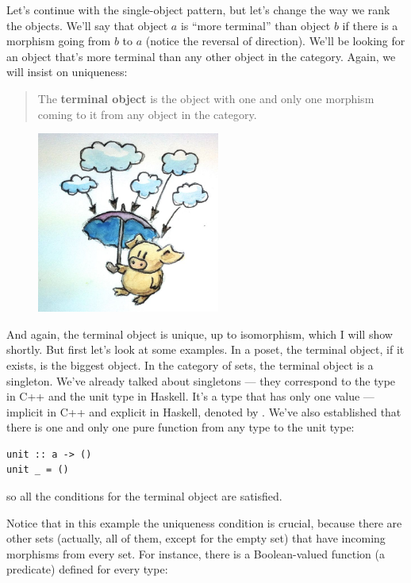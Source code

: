 Let's continue with the single-object pattern, but let's change the way
we rank the objects. We'll say that object $a$ is ``more terminal''
than object $b$ if there is a morphism going from $b$ to
$a$ (notice the reversal of direction). We'll be looking for an
object that's more terminal than any other object in the category.
Again, we will insist on uniqueness:

\begin{quote}
The \textbf{terminal object} is the object with one and only one
morphism coming to it from any object in the category.
\end{quote}

\begin{figure}[H]
\centering
\includegraphics[width=60mm]{images/final.jpg}
\end{figure}

\noindent
And again, the terminal object is unique, up to isomorphism, which I
will show shortly. But first let's look at some examples. In a poset,
the terminal object, if it exists, is the biggest object. In the
category of sets, the terminal object is a singleton. We've already
talked about singletons --- they correspond to the  type in
C++ and the unit type \code{()} in Haskell. It's a type that has only
one value --- implicit in C++ and explicit in Haskell, denoted by
\code{()}. We've also established that there is one and only one pure
function from any type to the unit type:

\begin{Verbatim}
unit :: a -> ()
unit _ = ()
\end{Verbatim}
so all the conditions for the terminal object are satisfied.

Notice that in this example the uniqueness condition is crucial, because
there are other sets (actually, all of them, except for the empty set)
that have incoming morphisms from every set. For instance, there is a
Boolean-valued function (a predicate) defined for every type:

